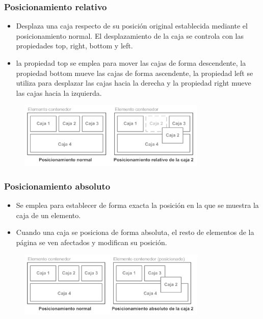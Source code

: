 \begin{frame}
\frametitle{Posicionamiento relativo}

\begin{itemize}
  \item Desplaza una caja respecto de su posición original establecida mediante el posicionamiento normal. El desplazamiento de la caja se controla con las propiedades top, right, bottom y left.
  \item la propiedad top se emplea para mover las cajas de forma descendente, la propiedad bottom mueve las cajas de forma ascendente, la propiedad left se utiliza para desplazar las cajas hacia la derecha y la propiedad right mueve las cajas hacia la izquierda. 
\end{itemize}

\begin{center}
\begin{figure}[p]
\includegraphics[width=0.8\textwidth]{figs/f0504.png}
\end{figure}
\end{center}

\end{frame}



\begin{frame}
\frametitle{Posicionamiento absoluto}

\begin{itemize}
  \item Se emplea para establecer de forma exacta la posición en la que se muestra la caja de un elemento. 
  \item Cuando una caja se posiciona de forma absoluta, el resto de elementos de la página se ven afectados y modifican su posición. 
\end{itemize}

\begin{center}
\begin{figure}[p]
\includegraphics[width=0.8\textwidth]{figs/f0516.png}
\end{figure}
\end{center}

\end{frame}


